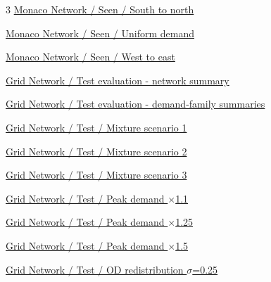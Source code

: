 \documentclass[11pt]{article}
\begin{document}
\begin{multicols}{3}
\noindent\hyperref[seen-monaco-seen_S_to_N]{Monaco Network / Seen / South to north}\hfill\pageref*{seen-monaco-seen_S_to_N}\par\vspace{3pt}
\noindent\hyperref[seen-monaco-seen_Uniform]{Monaco Network / Seen / Uniform demand}\hfill\pageref*{seen-monaco-seen_Uniform}\par\vspace{3pt}
\noindent\hyperref[seen-monaco-seen_W_to_E]{Monaco Network / Seen / West to east}\hfill\pageref*{seen-monaco-seen_W_to_E}\par\vspace{3pt}
\noindent\hyperref[test-grid-summary]{Grid Network / Test evaluation - network summary}\hfill\pageref*{test-grid-summary}\par\vspace{3pt}
\noindent\hyperref[test-grid-families]{Grid Network / Test evaluation - demand-family summaries}\hfill\pageref*{test-grid-families}\par\vspace{3pt}
\noindent\hyperref[test-grid-mixture_1]{Grid Network / Test / Mixture scenario 1}\hfill\pageref*{test-grid-mixture_1}\par\vspace{3pt}
\noindent\hyperref[test-grid-mixture_2]{Grid Network / Test / Mixture scenario 2}\hfill\pageref*{test-grid-mixture_2}\par\vspace{3pt}
\noindent\hyperref[test-grid-mixture_3]{Grid Network / Test / Mixture scenario 3}\hfill\pageref*{test-grid-mixture_3}\par\vspace{3pt}
\noindent\hyperref[test-grid-peak_1.1]{Grid Network / Test / Peak demand \ensuremath{\times}1.1}\hfill\pageref*{test-grid-peak_1.1}\par\vspace{3pt}
\noindent\hyperref[test-grid-peak_1.25]{Grid Network / Test / Peak demand \ensuremath{\times}1.25}\hfill\pageref*{test-grid-peak_1.25}\par\vspace{3pt}
\noindent\hyperref[test-grid-peak_1.5]{Grid Network / Test / Peak demand \ensuremath{\times}1.5}\hfill\pageref*{test-grid-peak_1.5}\par\vspace{3pt}
\noindent\hyperref[test-grid-redistribution_0.25]{Grid Network / Test / OD redistribution \ensuremath{\sigma}=0.25}\hfill\pageref*{test-grid-redistribution_0.25}\par\vspace{3pt}

\end{multicols}
\end{document}
